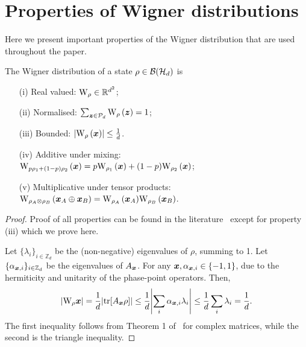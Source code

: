 \section{Properties of Wigner distributions}
\label{app:wigner}

Here we present important properties of the Wigner distribution that are used throughout the paper.

\begin{proposition}\label{thm:wstate}
  The Wigner distribution of a state $\rho \in \cal{B}(\cal{H}_d)$ is
  \begin{enumerate}
    \item[(i)]\label{en:w1} Real valued: $\W{\rho} \in \mathbb{R}^{d^2}$;
    \item[(ii)]\label{en:w2} Normalised: $\sum_{\bmz \in \cal{P}_d} \W[\bmz]{\rho}=1$;
    \item[(iii)]\label{en:w3} Bounded: $\abs{\W[\bmx]{\rho}} \leq \frac{1}{d}$.
    \item[(iv)]\label{en:w4} Additive under mixing: \vspace{2pt}\\
    $\W[\bmx]{p\rho_1 + (1-p)\rho_2} = p\W[\bmx]{\rho_1} + (1-p)\W[\bmx]{\rho_2}$;
    \item[(v)]\label{en:w5} Multiplicative under tensor products: \vspace{2pt}\\
    $\W[\bmx_A \oplus \bmx_B]{\rho_A \otimes \rho_B} = \W[\bmx_A]{\rho_A}\W[\bmx_B]{\rho_B}$.
	\end{enumerate}
\end{proposition}
\begin{proof}
	Proof of all properties can be found in the literature~\cite{cit:veitch,Vourdas_2004,cit:gross3,Wang_2019} except for property (iii) which we prove here.
	
	Let $\{\lambda_i\}_{i \in \mathbb{Z}_d}$ be the (non-negative) eigenvalues of $\rho$, summing to 1.
        Let $\{\alpha_{\bmx,i}\}_{i \in \mathbb{Z}_d}$ be the eigenvalues of $A_{\bmx}$. For any $\bmx, \alpha_{\bmx,i} \in \{-1, 1\}$, due to the hermiticity and unitarity of the phase-point operators. 
        Then,
        \begin{equation}
        \abs{\W{\rho}{\bmx}} = \frac{1}{d}\abs{\tr[A_{\bmx} \rho]} \leq \frac{1}{d} \abs{\sum_i \alpha_{\bmx,i} \lambda_i} \leq \frac{1}{d}\sum_i \lambda_i = \frac{1}{d}.
        \end{equation}
        The first inequality follows from Theorem 1 of~\cite{cit:mirsky} for complex matrices, while the second is the triangle inequality.
\end{proof}


